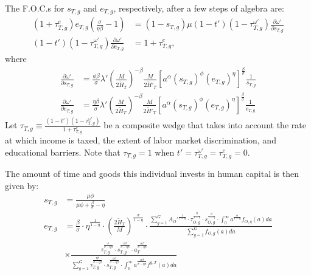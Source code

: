 \documentclass[onehalfspacing,11pt]{article}
\begin{document}
The F.O.C.s for $s_{T,g}$ and $e_{T,g}$, respectively, after a few steps of algebra are:
\begin{align}
\label{eq:foc-e}
(1+\tau^e_{T,g}) e_{T,g} \left( \frac{\sigma}{\eta\beta }-1 \right) & = \left(1-s_{T,g}\right) \mu(1-t')(1-\tau^{\omega '}_{T,g}) \frac{\partial \omega'}{\partial s_{T,g}} \\
\label{eq:foc-s}
(1-t')(1-\tau^{\omega '}_{T,g}) \frac{\partial \omega'}{\partial e_{T,g}} & = 1+\tau^e_{T,g},
\end{align}
where
\begin{align}
 \frac{\partial \omega'}{\partial s_{T,g}} & =  \frac{\phi\beta }{\sigma} \lambda' \left(\frac{M}{2 \widetilde{H}_T}\right)^{-\beta} \frac{M}{2 {\widetilde{H}'_T}} \left[ a^\alpha (s_{T,g})^\phi (e_{T,g})^\eta \right]^{\frac{\beta}{\sigma}} \frac{1}{s_{T,g}} \label{eq:sT} \\
 \frac{\partial \omega'}{\partial e_{T,g}} & = \frac{\eta\beta }{\sigma} \lambda' \left(\frac{M}{2 \widetilde{H}_T}\right)^{-\beta} \frac{M}{2 {\widetilde{H}'_T}} \left[ a^\alpha (s_{T,g})^\phi (e_{T,g})^\eta \right]^{\frac{\beta}{\sigma}} \frac{1}{e_{T,g}} \label{eq:eT}
\end{align}
Let $\tau_{T,g} \equiv \frac{\left( 1-t' \right) \left( 1-\tau^{\omega '}_{T,g} \right)}{1+\tau^e_{T,g}}$ be a composite wedge that takes into account the rate at which income is taxed, the extent of labor market discrimination, and educational barriers. Note that $\tau_{T,g}=1$ when $t' = \tau^{\omega '}_{T,g} = \tau^e_{T,g} = 0$.

The amount of time and goods this individual invests in human capital is then given by:
\begin{align}
\label{app_eq:s_T}
s_{T,g} & = \frac{\mu \phi}{\mu \phi+\tfrac{\beta}{\sigma}-\eta} \\
\label{app_eq:e_T}
e_{T,g} & = \tfrac{\beta}{\sigma}\cdot\eta^{\frac{1}{1-\eta}}\cdot \left(\tfrac{2\widetilde{H}_T}{M}\right)^{\frac{\sigma}{1-\eta}} \cdot \frac{\sum_{g=1}^G {A_O'}^\frac{1}{1-\eta}\cdot\tau_{O,g}^\frac{\eta}{1-\eta} \cdot s_{O,g}^\frac{\phi}{1-\eta}\cdot \int_0^\infty a^{\frac{\alpha}{1-\eta}} f_{O,g}(a)da}{\sum_{g=1}^G f_{O,g}(a)da} \nonumber\\
& \times \frac{\tau_{T,g}^\frac{\sigma}{\sigma-\eta\beta } \cdot s_{T,g}^\frac{\phi\beta }{\sigma-\eta\beta } \cdot a_T^\frac{\alpha\beta }{\sigma-\eta\beta}}{\sum_{g=1}^G \tau_{T,g}^\frac{\eta\beta }{\sigma-\eta\beta } \cdot s_{T,g}^\frac{\phi\beta }{\sigma-\eta\beta } \cdot \int_0^\infty a^\frac{\alpha\beta}{\sigma-\eta\beta } f^{g,T}(a)da}
\end{align}
\end{document}
